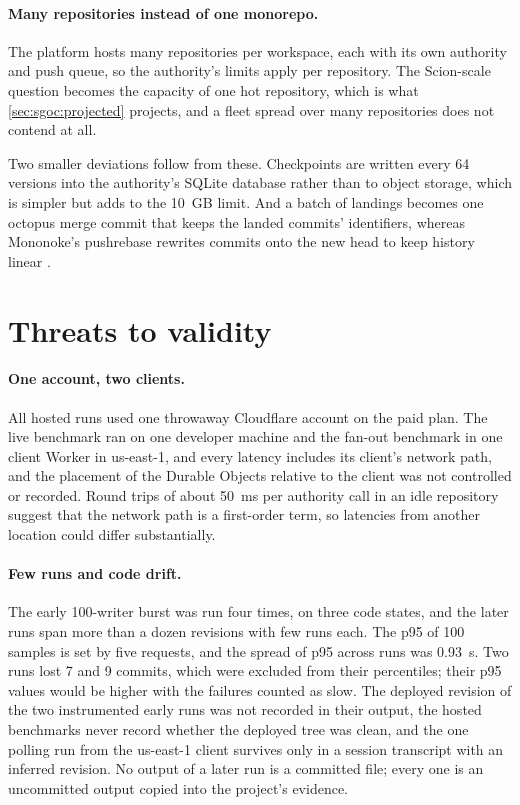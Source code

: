 \documentclass[11pt,letterpaper]{article}
\theoremstyle{definition}
\theoremstyle{remark}
\begin{document}
\paragraph{Many repositories instead of one monorepo.} The platform hosts many repositories per workspace, each with its own authority and push queue, so the authority's limits apply per repository. The Scion-scale question becomes the capacity of one hot repository, which is what \cref{sec:sgoc:projected} projects, and a fleet spread over many repositories does not contend at all.

Two smaller deviations follow from these. Checkpoints are written every 64 versions into the authority's SQLite database rather than to object storage, which is simpler but adds to the 10~GB limit. And a batch of landings becomes one octopus merge commit that keeps the landed commits' identifiers, whereas Mononoke's pushrebase rewrites commits onto the new head to keep history linear \cite{mononokepushrebase}.

\section{Threats to validity}
\label{sec:sgoc:threats}

\paragraph{One account, two clients.} All hosted runs used one throwaway Cloudflare account on the paid plan. The live benchmark ran on one developer machine and the fan-out benchmark in one client Worker in us-east-1, and every latency includes its client's network path, and the placement of the Durable Objects relative to the client was not controlled or recorded. Round trips of about 50~ms per authority call in an idle repository suggest that the network path is a first-order term, so latencies from another location could differ substantially. %

\paragraph{Few runs and code drift.} The early 100-writer burst was run four times, on three code states, and the later runs span more than a dozen revisions with few runs each. The p95 of 100 samples is set by five requests, and the spread of p95 across runs was 0.93~s. Two runs lost 7 and 9 commits, which were excluded from their percentiles; their p95 values would be higher with the failures counted as slow. %
The deployed revision of the two instrumented early runs was not recorded in their output, the hosted benchmarks never record whether the deployed tree was clean, and the one polling run from the us-east-1 client survives only in a session transcript with an inferred revision. %
No output of a later run is a committed file; every one is an uncommitted output copied into the project's evidence.
\end{document}
